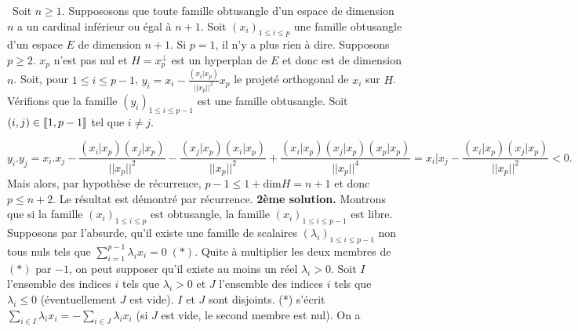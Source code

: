 \documentclass[11pt,a4paper]{article}
\newcommand{\llbracket}{\left[\kern-0.15em\left[}
\newcommand{\rrbracket}{\right]\kern-0.15em\right]}
\begin{document}
\textbullet~Soit $n\geq 1$. Suppososons que toute famille obtusangle d'un espace de dimension $n$ a un cardinal inférieur ou égal à $n+1$.
Soit $(x_i)_{1\leq i\leq p}$ une famille obtusangle d'un espace $E$ de dimension $n+1$. Si $p=1$, il n'y a plus rien à dire. Supposons $p\geq2$. $x_p$ n'est pas nul et $H=x_p^\bot$ est un hyperplan de $E$ et donc est de dimension $n$.
Soit, pour $1\leq i\leq p-1$, $y_i=x_i-\frac{(x_i|x_p)}{||x_p||^2}x_p$ le projeté orthogonal de $x_i$ sur $H$.
Vérifions que la famille $(y_i)_{1\leq i\leq p-1}$ est une famille obtusangle. Soit $(i,j)\in\llbracket1,p-1\rrbracket$ tel que $i\neq j$.
 
$$y_i.y_j=x_i.x_j-\frac{(x_i|x_p)(x_j|x_p)}{||x_p||^2}-\frac{(x_j|x_p)(x_i|x_p)}{||x_p||^2}+\frac{(x_i|x_p)(x_j|x_p)(x_p|x_p)}{||x_p||^4}= x_i|x_j-\frac{(x_i|x_p)(x_j|x_p)}{||x_p||^2}<0.$$
Mais alors, par hypothèse de récurrence, $p-1\leq 1+\mbox{dim}H=n+1$ et donc $p\leq n+2$. 
Le résultat est démontré par récurrence.
\textbf{2ème solution.}
Montrons que si la famille $(x_i)_{1\leq i\leq p}$ est obtusangle, la famille $(x_i)_{1\leq i\leq p-1}$ est libre.
Supposons par l'absurde, qu'il existe une famille de scalaires $(\lambda_i)_{1\leq i\leq p-1}$ non tous nuls tels que $\sum_{i=1}^{p-1}\lambda_ix_i=0\;(*)$.
Quite à multiplier les deux membres de $(*)$ par $-1$, on peut supposer qu'il existe au moins un réel $\lambda_i>0$. Soit $I$ l'ensemble des indices $i$ tels que $\lambda_i>0$ et $J$ l'ensemble des indices $i$ tels que $\lambda_i\leq0$ (éventuellement $J$ est vide). $I$ et $J$ sont disjoints.
(*) s'écrit $\sum_{i\in I}^{}\lambda_ix_i=-\sum_{i\in J}^{}\lambda_ix_i$ (si $J$ est vide, le second membre est nul).
On a 
\end{document}
